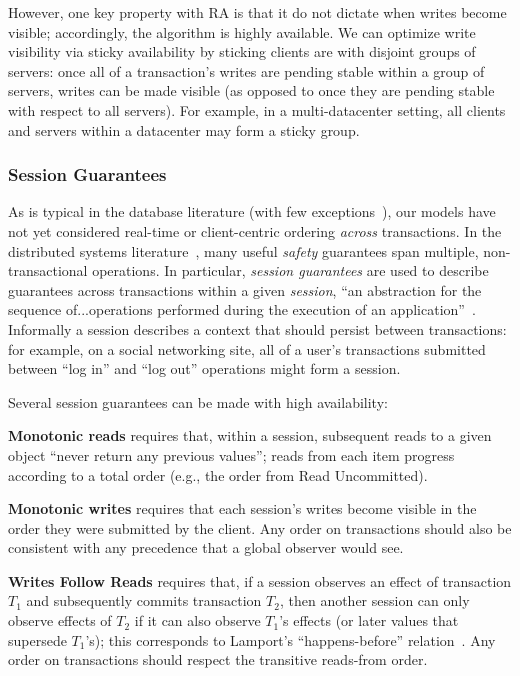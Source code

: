 However, one key property with RA is that it do not dictate when
writes become visible; accordingly, the algorithm is highly
available. We can optimize write visibility via sticky availability by
sticking clients are with disjoint groups of servers: once all of a
transaction's writes are pending stable within a group of servers,
writes can be made visible (as opposed to once they are pending stable
with respect to all servers). For example, in a multi-datacenter
setting, all clients and servers within a datacenter may form a sticky
group.


\subsubsection{Session Guarantees}

As is typical in the database literature (with few
exceptions~\cite{daudjee-session}), our models have not yet considered
real-time or client-centric ordering \textit{across} transactions. In
the distributed systems literature~\cite{sessionguarantees, vogels-defs}, many
useful \textit{safety} guarantees span multiple, non-transactional
operations. In particular, \textit{session guarantees} are used to
describe guarantees across transactions within a given
\textit{session}, ``an abstraction for the sequence of...operations
performed during the execution of an
application''~\cite{sessionguarantees}. Informally a session describes
a context that should persist between transactions: for example, on a
social networking site, all of a user's transactions submitted between
``log in'' and ``log out'' operations might form a session.

Several session guarantees can be made with high availability:

\vspace{.5em}\noindent\textbf{{Monotonic reads}} requires that, within
a session, subsequent reads to a given object ``never return any
previous values''; reads from each item progress according to a total
order (e.g., the order from Read Uncommitted).

\vspace{.5em}\noindent\textbf{{Monotonic writes}} requires that each
session's writes become visible in the order they were submitted by
the client. Any order on transactions should also be consistent with
any precedence that a global observer would see.

\vspace{.5em}\noindent\textbf{{Writes Follow Reads}} requires that, if
a session observes an effect of transaction $T_1$ and subsequently
commits transaction $T_2$, then another session can only observe
effects of $T_2$ if it can also observe $T_1$'s effects (or later
values that supersede $T_1$'s); this corresponds to Lamport's
``happens-before'' relation~\cite{lamportclocks}.  Any order on
transactions should respect the transitive reads-from
order.\vspace{.5em}

